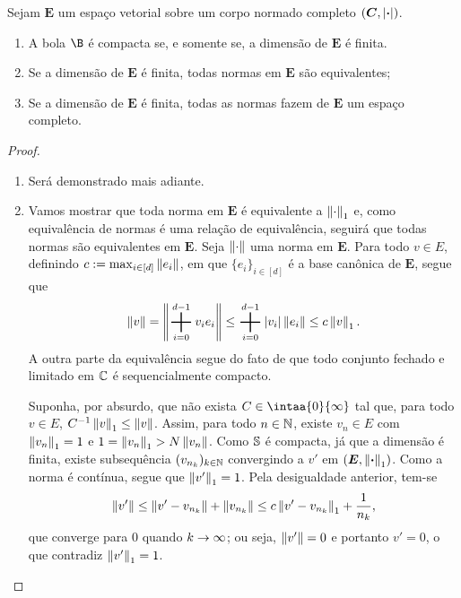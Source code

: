 \begin{prop}
Sejam $\bm E$ um espaço vetorial sobre um corpo normado completo $(\bm C,\abs{\var})$.
	\begin{enumerate}
	\item A bola $\B$ é compacta se, e somente se, a dimensão de $\bm E$ é finita.
	\item Se a dimensão de $\bm E$ é finita, todas normas em $\bm E$ são equivalentes;
	\item Se a dimensão de $\bm E$ é finita, todas as normas fazem de $\bm E$ um espaço completo. 
	\end{enumerate}
\end{prop}
\begin{proof}
	\begin{enumerate}
	\item Será demonstrado mais adiante.
	
	\item Vamos mostrar que toda norma em $\bm E$ é equivalente a $\nor{\cdot}_1$ e, como equivalência de normas é uma relação de equivalência, seguirá que todas normas são equivalentes em $\bm E$. Seja $\nor{\cdot}$ uma norma em $\bm E$. Para todo $v \in E$, definindo $c := \max_{i \in [d]} \nor{e_i}$, em que $\{e_i\}_{i \in [d]}$ é a base canônica de $\bm E$, segue que
	\begin{equation*}
	\nor{v} = \nor{\sum_{i=0}^{d-1} v_ie_i} \leq \sum_{i=0}^{d-1}\abs{v_i}\nor{e_i} \leq c\nor{v}_1.
	\end{equation*}
A outra parte da equivalência segue do fato de que todo conjunto fechado e limitado em $\C$ é sequencialmente compacto.

Suponha, por absurdo, que não exista $C \in \intaa{0}{\infty}$ tal que, para todo $v \in E$, $C\inv\nor{v}_1 \leq \nor{v}$. Assim, para todo $n \in \N$, existe $v_n \in E$ com $\nor{v_n}_1 = 1$ e $1 = \nor{v_n}_1 > N\nor{v_n}$. Como $\S$ é compacta, já que a dimensão é finita, existe subsequência $(v_{n_k})_{k \in \N}$ convergindo a $v'$ em $(\bm E,\nor{\var}_1)$. Como a norma é contínua, segue que $\nor{v'}_1 = 1$. Pela desigualdade anterior, tem-se
	\begin{equation*}
	\nor{v'} \leq \nor{v' - v_{n_k}} + \nor{v_{n_k}} \leq c\nor{v' - v_{n_k}}_1 + \frac{1}{n_k},
	\end{equation*}
que converge para $0$ quando $k \conv \infty$; ou seja, $\nor{v'}=0$ e portanto $v'=0$, o que contradiz $\nor{v'}_1=1$.


\end{enumerate}
\end{proof}
